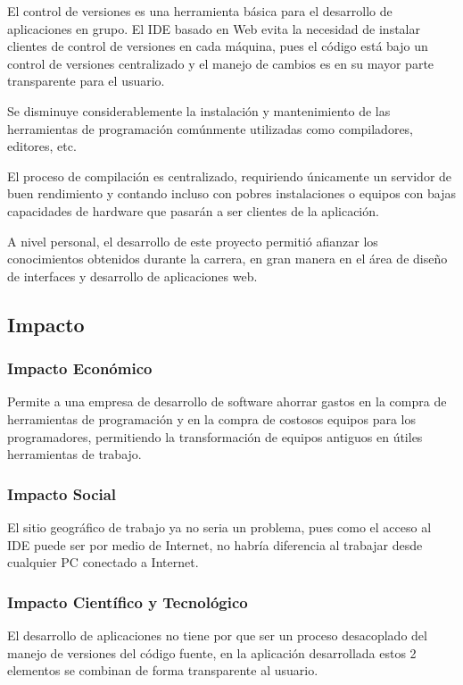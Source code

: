 El control de versiones es una herramienta básica para el desarrollo de aplicaciones en grupo. El IDE basado en Web evita la necesidad de instalar clientes de control de versiones en cada máquina, pues el código está bajo un control de versiones centralizado y el manejo de cambios es en su mayor parte transparente para el usuario.

Se disminuye considerablemente la instalación y mantenimiento de las herramientas de programación comúnmente utilizadas como compiladores, editores, etc.

El proceso de compilación es centralizado, requiriendo únicamente un servidor de buen rendimiento y contando incluso con pobres instalaciones o equipos con bajas capacidades de hardware que pasarán a ser clientes de la aplicación.

A nivel personal, el desarrollo de este proyecto permitió afianzar los conocimientos obtenidos durante la carrera, en gran manera en el área de diseño de interfaces y desarrollo de aplicaciones web.


\subsection{Impacto}

\subsubsection{Impacto Económico}

Permite a una empresa de desarrollo de software ahorrar gastos en la compra de herramientas de programación y en la compra de costosos equipos para los programadores, permitiendo la transformación de equipos antiguos en útiles herramientas de trabajo.

\subsubsection{Impacto Social}

El sitio geográfico de trabajo ya no seria un problema, pues como el acceso al IDE puede ser por medio de Internet, no habría diferencia al trabajar desde cualquier PC conectado a Internet.

\subsubsection{Impacto Científico y Tecnológico}

El desarrollo de aplicaciones no tiene por que ser un proceso desacoplado del manejo de versiones del código fuente, en la aplicación desarrollada estos 2 elementos se combinan de forma transparente al usuario.